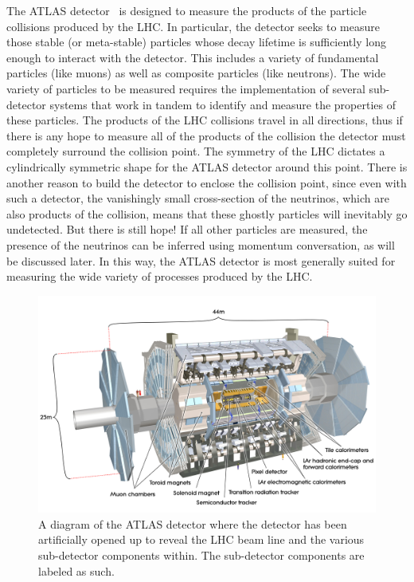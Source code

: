 


The ATLAS detector~\cite{ATLAS} is designed to measure
the products of the particle collisions produced by the LHC.
In particular, the detector seeks to measure those stable 
(or meta-stable) particles whose decay lifetime is sufficiently
long enough to interact with the detector.  This includes
a variety of fundamental particles (like muons) as well as 
composite particles (like neutrons). The wide variety of 
particles to be measured requires the implementation
of several sub-detector systems that work in tandem 
to identify and measure the properties of these particles.
The products of the LHC collisions travel in all directions, 
thus if there is any hope to measure all of the products of the collision
the detector must completely surround the collision point. 
The symmetry of the LHC dictates a cylindrically symmetric
shape for the ATLAS detector around this point.
There is another reason to build the detector to enclose
the collision point, since 
even with such a detector, the vanishingly small
cross-section of the neutrinos, which are also products
of the collision, means that these ghostly particles
will inevitably go undetected. But there is still hope!
If all other particles are measured, 
the presence of the neutrinos can be inferred 
using momentum conversation, as will be discussed later.  
In this way, the ATLAS detector is most generally suited
for measuring the wide variety of processes produced
by the LHC. 

\begin{figure}[ht!]
\centering
\includegraphics[width=.9\textwidth]{figures/atlas/detector.jpg}
\caption{A diagram of the ATLAS detector where the detector has
been artificially opened up to reveal the LHC beam line and the
various sub-detector components within. The sub-detector components
are labeled as such.}
\label{fig:atlas}
\end{figure}

